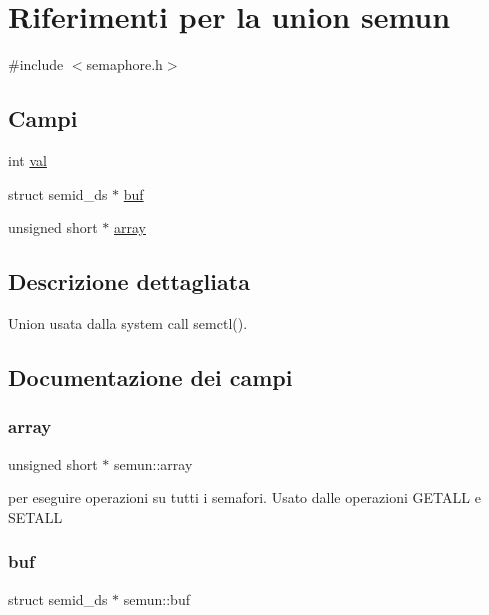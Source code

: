 \hypertarget{unionsemun}{}\section{Riferimenti per la union semun}
\label{unionsemun}


{\ttfamily \#include $<$semaphore.\+h$>$}

\subsection*{Campi}
\begin{DoxyCompactItemize}
\item 
int \hyperlink{unionsemun_ac6121ecb6d04a024e07e12bd71b94031}{val}
\item 
struct semid\+\_\+ds $\ast$ \hyperlink{unionsemun_abe0ba6ad77214cee618027739e992503}{buf}
\item 
unsigned short $\ast$ \hyperlink{unionsemun_a1c74eb9326763d3854dc90167e1f4460}{array}
\end{DoxyCompactItemize}


\subsection{Descrizione dettagliata}
Union usata dalla system call semctl(). 

\subsection{Documentazione dei campi}
\mbox{\label{unionsemun_a1c74eb9326763d3854dc90167e1f4460}} 
\subsubsection{\texorpdfstring{array}{array}}
{\footnotesize\ttfamily unsigned short $\ast$ semun\+::array}

per eseguire operazioni su tutti i semafori. Usato dalle operazioni G\+E\+T\+A\+LL e S\+E\+T\+A\+LL \mbox{\label{unionsemun_abe0ba6ad77214cee618027739e992503}} 
\subsubsection{\texorpdfstring{buf}{buf}}
{\footnotesize\ttfamily struct semid\+\_\+ds $\ast$ semun\+::buf}

